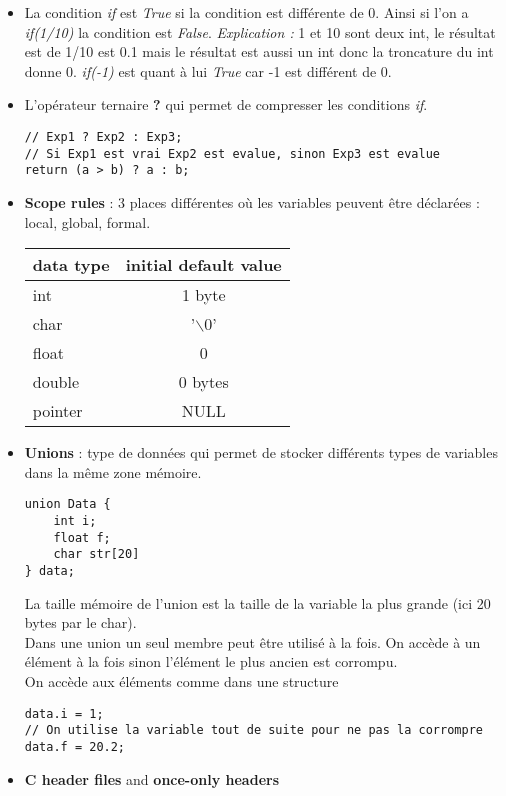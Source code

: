\documentclass[12pt,a4paper]{article}
\begin{document}
\begin{itemize}
\item La condition \textit{if} est \textit{True} si la condition est différente de 0. 
\newline Ainsi si l'on a \textit{if(1/10)} la condition est \textit{False}. \textit{Explication : }1 et 10 sont deux int, le résultat est de 1/10 est 0.1 mais le résultat est aussi un int donc la troncature du int donne 0.
\newline \textit{if(-1)} est quant à lui \textit{True} car -1 est différent de 0.
\item L'opérateur ternaire \textbf{?} qui permet de compresser les conditions \textit{if}.
\begin{lstlisting}
// Exp1 ? Exp2 : Exp3;
// Si Exp1 est vrai Exp2 est evalue, sinon Exp3 est evalue
return (a > b) ? a : b;
\end{lstlisting}
\item \textbf{Scope rules} : 3 places différentes où les variables peuvent être déclarées : local, global, formal.
\newline
\begin{tabular}{|l|c|}
  \hline
  data type & initial default value \\
  \hline \hline
  int & 1 byte \\ \hline
  char & '$\backslash0$'  \\ \hline
  float & 0 \\ \hline
  double & 0 bytes \\ \hline
  pointer & NULL \\ \hline
\end{tabular}
\item \textbf{Unions} : type de données qui permet de stocker différents types de variables dans la même zone mémoire.
\begin{lstlisting}
union Data {
	int i;
	float f;
	char str[20]
} data;
\end{lstlisting}
La taille mémoire de l'union est la taille de la variable la plus grande (ici 20 bytes par le char).\\
Dans une union un seul membre peut être utilisé à la fois. On accède à un élément à la fois sinon l'élément le plus ancien est corrompu. \\
On accède aux éléments comme dans une structure
\begin{lstlisting}
data.i = 1;
// On utilise la variable tout de suite pour ne pas la corrompre
data.f = 20.2;
\end{lstlisting}
\item \textbf{C header files} and \textbf{once-only headers}

\end{itemize}
\end{document}
